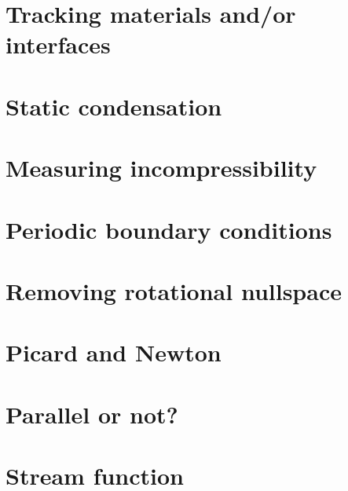\section{Tracking materials and/or interfaces}  %
\newpage %
\section{Static condensation}  %
\newpage %
\section{Measuring incompressibility \label{ss_incomp}}  %
\newpage %
\section{Periodic boundary conditions\label{ss_periodic}} %
\newpage %
\section{Removing rotational nullspace\label{ss_nullspace}}  %
\newpage %
\section{Picard and Newton \label{ss_nonlinear}}  %
\newpage %
\section{Parallel or not?} \label{sec:parallel}  %
\newpage %
\section{Stream function} \label{sec:streamfunction}  %
\newpage %
